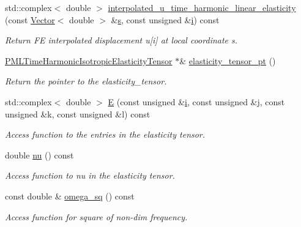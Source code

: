 \begin{DoxyCompactItemize}
std\+::complex$<$ double $>$ \hyperlink{classoomph_1_1PMLTimeHarmonicLinearElasticityEquationsBase_a5b5743ede86b76b583c6c881d1b2b862}{interpolated\+\_\+u\+\_\+time\+\_\+harmonic\+\_\+linear\+\_\+elasticity} (const \hyperlink{classoomph_1_1Vector}{Vector}$<$ double $>$ \&\hyperlink{cfortran_8h_ab7123126e4885ef647dd9c6e3807a21c}{s}, const unsigned \&\hyperlink{cfortran_8h_adb50e893b86b3e55e751a42eab3cba82}{i}) const
\begin{DoxyCompactList}\small\item\em Return FE interpolated displacement u\mbox{[}i\mbox{]} at local coordinate s. \end{DoxyCompactList}\item 
\hyperlink{classoomph_1_1PMLTimeHarmonicIsotropicElasticityTensor}{P\+M\+L\+Time\+Harmonic\+Isotropic\+Elasticity\+Tensor} $\ast$\& \hyperlink{classoomph_1_1PMLTimeHarmonicLinearElasticityEquationsBase_a624c372e3bb834726f59a12fceb650ff}{elasticity\+\_\+tensor\+\_\+pt} ()
\begin{DoxyCompactList}\small\item\em Return the pointer to the elasticity\+\_\+tensor. \end{DoxyCompactList}\item 
std\+::complex$<$ double $>$ \hyperlink{classoomph_1_1PMLTimeHarmonicLinearElasticityEquationsBase_a5d54836b3f071ce2940d4afb835e8d34}{E} (const unsigned \&\hyperlink{cfortran_8h_adb50e893b86b3e55e751a42eab3cba82}{i}, const unsigned \&j, const unsigned \&k, const unsigned \&l) const
\begin{DoxyCompactList}\small\item\em Access function to the entries in the elasticity tensor. \end{DoxyCompactList}\item 
double \hyperlink{classoomph_1_1PMLTimeHarmonicLinearElasticityEquationsBase_aa2a77d04dddbcbf3a093d4be044d1355}{nu} () const
\begin{DoxyCompactList}\small\item\em Access function to nu in the elasticity tensor. \end{DoxyCompactList}\item 
const double \& \hyperlink{classoomph_1_1PMLTimeHarmonicLinearElasticityEquationsBase_ab38d63030140509919e021c6abe21ef7}{omega\+\_\+sq} () const
\begin{DoxyCompactList}\small\item\em Access function for square of non-\/dim frequency. \end{DoxyCompactList}\item 

\end{DoxyCompactItemize}
